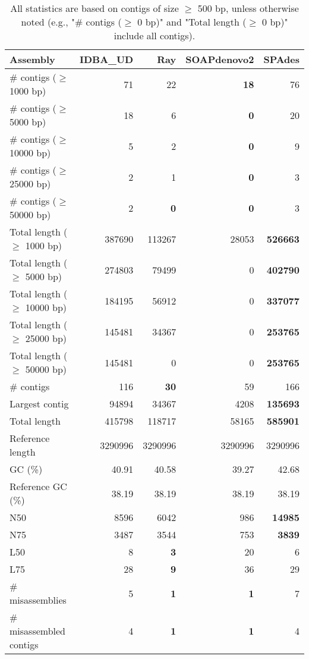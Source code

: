 \documentclass[12pt,a4paper]{article}
\begin{document}
\begin{table}[ht]
\begin{center}
\caption{All statistics are based on contigs of size $\geq$ 500 bp, unless otherwise noted (e.g., "\# contigs ($\geq$ 0 bp)" and "Total length ($\geq$ 0 bp)" include all contigs).}
\begin{tabular}{|l*{4}{|r}|}
\hline
Assembly & IDBA\_UD & Ray & SOAPdenovo2 & SPAdes \\ \hline
\# contigs ($\geq$ 1000 bp) & 71 & 22 & {\bf 18} & 76 \\ \hline
\# contigs ($\geq$ 5000 bp) & 18 & 6 & {\bf 0} & 20 \\ \hline
\# contigs ($\geq$ 10000 bp) & 5 & 2 & {\bf 0} & 9 \\ \hline
\# contigs ($\geq$ 25000 bp) & 2 & 1 & {\bf 0} & 3 \\ \hline
\# contigs ($\geq$ 50000 bp) & 2 & {\bf 0} & {\bf 0} & 3 \\ \hline
Total length ($\geq$ 1000 bp) & 387690 & 113267 & 28053 & {\bf 526663} \\ \hline
Total length ($\geq$ 5000 bp) & 274803 & 79499 & 0 & {\bf 402790} \\ \hline
Total length ($\geq$ 10000 bp) & 184195 & 56912 & 0 & {\bf 337077} \\ \hline
Total length ($\geq$ 25000 bp) & 145481 & 34367 & 0 & {\bf 253765} \\ \hline
Total length ($\geq$ 50000 bp) & 145481 & 0 & 0 & {\bf 253765} \\ \hline
\# contigs & 116 & {\bf 30} & 59 & 166 \\ \hline
Largest contig & 94894 & 34367 & 4208 & {\bf 135693} \\ \hline
Total length & 415798 & 118717 & 58165 & {\bf 585901} \\ \hline
Reference length & 3290996 & 3290996 & 3290996 & 3290996 \\ \hline
GC (\%) & 40.91 & 40.58 & 39.27 & 42.68 \\ \hline
Reference GC (\%) & 38.19 & 38.19 & 38.19 & 38.19 \\ \hline
N50 & 8596 & 6042 & 986 & {\bf 14985} \\ \hline
N75 & 3487 & 3544 & 753 & {\bf 3839} \\ \hline
L50 & 8 & {\bf 3} & 20 & 6 \\ \hline
L75 & 28 & {\bf 9} & 36 & 29 \\ \hline
\# misassemblies & 5 & {\bf 1} & {\bf 1} & 7 \\ \hline
\# misassembled contigs & 4 & {\bf 1} & {\bf 1} & 4 \\ \hline

\end{tabular}
\end{center}
\end{table}
\end{document}

